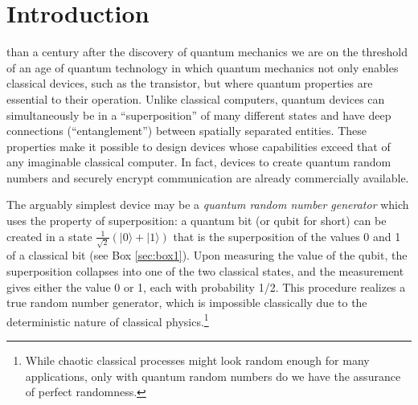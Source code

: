 \documentclass[journal]{IEEEtran}
\begin{document}
\begin{IEEEkeywords}
\end{IEEEkeywords}






%
\IEEEpeerreviewmaketitle



\section{Introduction}

 than a century after the discovery of quantum mechanics we are on the threshold of an age of quantum technology in which quantum mechanics not only enables classical devices,  such as the transistor, but where quantum properties are essential to their operation. Unlike classical computers, quantum devices can simultaneously be in a ``superposition'' of many different states and have deep connections (``entanglement'') between spatially separated entities.  These properties make it possible to design devices whose capabilities exceed that of any imaginable classical computer.  In fact, devices to create quantum random numbers and securely encrypt communication are already commercially available. 

The arguably simplest device may be a {\em quantum random number generator} which uses the property of superposition:  a quantum bit (or qubit for short) can be created in a state $\frac{1}{\sqrt{2}}(|0\rangle + |1\rangle)$ that is the superposition  of the values 0 and 1 of a classical bit (see Box \ref{sec:box1}). Upon measuring the value of the qubit, the superposition collapses into one of the two classical states, and the measurement gives either the value 0 or 1, each with probability 1/2. This procedure realizes a true random number generator, which is impossible classically due to the deterministic nature of classical physics.\footnote{While chaotic classical processes might look random enough for many applications, only with quantum random numbers do we have the assurance of perfect randomness.}
\end{document}
